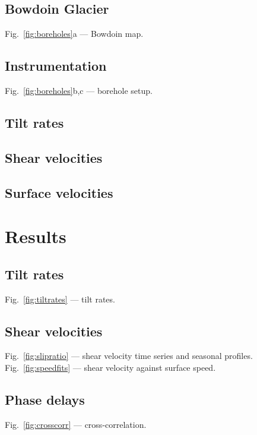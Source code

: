 \documentclass[utf8]{article}
\begin{document}
\subsection{Bowdoin Glacier}

    Fig.~\ref{fig:boreholes}a --- Bowdoin map.

\subsection{Instrumentation}

    Fig.~\ref{fig:boreholes}b,c --- borehole setup.

\subsection{Tilt rates}
\subsection{Shear velocities}
\subsection{Surface velocities}

\section{Results}

\subsection{Tilt rates}

    Fig.~\ref{fig:tiltrates} --- tilt rates.

\subsection{Shear velocities}

    Fig.~\ref{fig:slipratio} --- shear velocity time series and seasonal
    profiles.
    Fig.~\ref{fig:speedfits} --- shear velocity against surface speed.

\subsection{Phase delays}

    Fig.~\ref{fig:crosscorr} --- cross-correlation.
\end{document}
